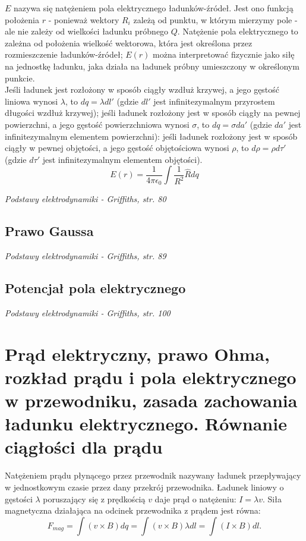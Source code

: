 \documentclass{article}
\begin{document}
$E$ nazywa się natężeniem pola elektrycznego ładunków-źródeł. Jest ono funkcją położenia $r$ - ponieważ wektory $R_i$ zależą od punktu, w którym mierzymy pole - ale nie zależy od wielkości ładunku próbnego $Q$. Natężenie pola elektrycznego to zależna od położenia wielkość wektorowa, która jest określona przez rozmieszczenie ładunków-źródeł; $E(r)$ można interpretować fizycznie jako siłę na jednostkę ładunku, jaka działa na ładunek próbny umieszczony w określonym punkcie. \\

Jeśli ładunek jest rozłożony w sposób ciągły wzdłuż krzywej, a jego gęstość liniowa wynosi $\lambda$, to $dq = \lambda dl'$ (gdzie $dl'$ jest infinitezymalnym przyrostem długości
wzdłuż krzywej); jeśli ładunek rozłożony jest w sposób ciągły na pewnej powierzchni, a jego gęstość powierzchniowa wynosi $\sigma$, to $dq = \sigma da'$ (gdzie $da'$ jest infinitezymalnym elementem powierzchni): jeśli ładunek rozłożony jest w sposób ciągły w pewnej objętości, a jego gęstość objętościowa wynosi $\rho$, to $d\rho = \rho d\tau'$ (gdzie $d\tau'$ jest infinitezymalnym elementem objętości).
\begin{equation*}
    E(r) = \frac{1}{4\pi\epsilon_0}\int \frac{1}{R^2}\hat{R}dq
\end{equation*}

\textit{Podstawy elektrodynamiki - Griffiths, str. 80}

\subsection{Prawo Gaussa}
\textit{Podstawy elektrodynamiki - Griffiths, str. 89}

\subsection{Potencjał pola elektrycznego}
\textit{Podstawy elektrodynamiki - Griffiths, str. 100}

\section{Prąd elektryczny, prawo Ohma, rozkład prądu i pola elektrycznego w przewodniku, zasada zachowania ładunku elektrycznego. Równanie ciągłości dla prądu}

Natężeniem prądu płynącego przez przewodnik nazywany ładunek przepływający w jednostkowym czasie przez dany przekrój przewodnika. Ładunek liniowy o gęstości $\lambda$ poruszający się z prędkością $v$ daje prąd o natężeniu: $I=\lambda v$. Siła magnetyczna działająca na odcinek przewodnika z prądem jest równa:
\begin{equation*}
    F_{mag}=\int (v \times B)dq = \int (v\times B) \lambda dl = \int (I\times B) dl.
\end{equation*}
\end{document}
